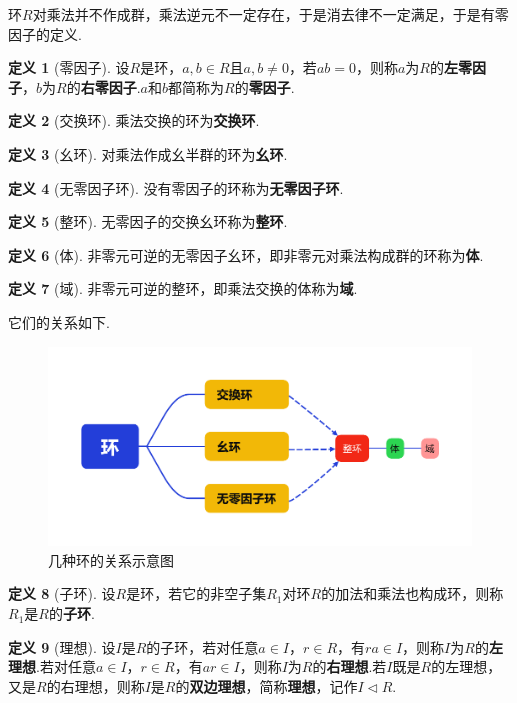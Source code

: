 \documentclass[12pt]{ctexart}
\theoremstyle{definition}
\newtheorem{definition}{定义}
\theoremstyle{plain}
\begin{document}
	环$R$对乘法并不作成群，乘法逆元不一定存在，于是消去律不一定满足，于是有零因子的定义.
	\begin{definition}[零因子]
		设$R$是环，$a,b\in R$且$a,b\neq 0$，若$ab=0$，则称$a$为$R$的\textbf{左零因子}，$b$为$R$的\textbf{右零因子}.$a$和$b$都简称为$R$的\textbf{零因子}.
	\end{definition}
	\begin{definition}[交换环]
		乘法交换的环为\textbf{交换环}.
	\end{definition}
	\begin{definition}[幺环]
		对乘法作成幺半群的环为\textbf{幺环}.
	\end{definition}
	\begin{definition}[无零因子环]
		没有零因子的环称为\textbf{无零因子环}.
	\end{definition}
	\begin{definition}[整环]
		无零因子的交换幺环称为\textbf{整环}.
	\end{definition}
	\begin{definition}[体]
		非零元可逆的无零因子幺环，即非零元对乘法构成群的环称为\textbf{体}.
	\end{definition}
	\begin{definition}[域]
		非零元可逆的整环，即乘法交换的体称为\textbf{域}.
	\end{definition}
	它们的关系如下.
	\begin{figure}[htbp]
		\centering
		\includegraphics[width=15cm]{mindmap.pdf}
		\caption{几种环的关系示意图}
	\end{figure}
	\begin{definition}[子环]
		设$R$是环，若它的非空子集$R_1$对环$R$的加法和乘法也构成环，则称$R_1$是$R$的\textbf{子环}.
	\end{definition}
	\begin{definition}[理想]
		设$I$是$R$的子环，若对任意$a\in I$，$r\in R$，有$ra\in I$，则称$I$为$R$的\textbf{左理想}.若对任意$a\in I$，$r\in R$，有$ar\in I$，则称$I$为$R$的\textbf{右理想}.若$I$既是$R$的左理想，又是$R$的右理想，则称$I$是$R$的\textbf{双边理想}，简称\textbf{理想}，记作$I\lhd R$.
	\end{definition}
\end{document}
